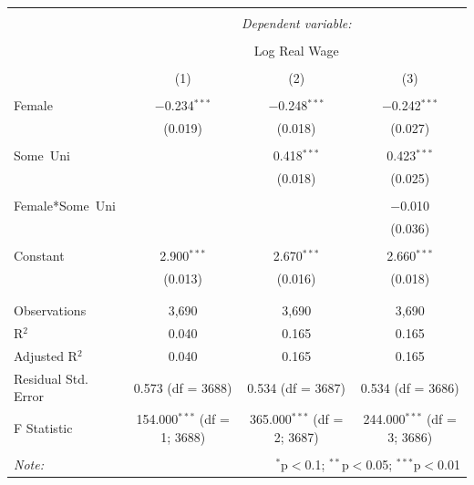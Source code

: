 \documentclass{article}
\begin{document}
\begin{table}[!htbp] \centering 
\captionsetup{labelfont=bf}
\label{tab:title}
\begin{tabular}{@{\extracolsep{5pt}}lccc} 
\\[-1.8ex]\hline 
\hline \\[-1.8ex] 
 & \multicolumn{3}{c}{\textit{Dependent variable:}} \\ 
\cline{2-4} 
\\[-1.8ex] & \multicolumn{3}{c}{Log Real Wage} \\ 
\\[-1.8ex] & (1) & (2) & (3)\\ 
\hline \\[-1.8ex] 
 Female & $-$0.234$^{***}$ & $-$0.248$^{***}$ & $-$0.242$^{***}$ \\ 
  & (0.019) & (0.018) & (0.027) \\ 
  & & & \\ 
 Some\ Uni &  & 0.418$^{***}$ & 0.423$^{***}$ \\ 
  &  & (0.018) & (0.025) \\ 
  & & & \\ 
 Female*Some\ Uni &  &  & $-$0.010 \\ 
  &  &  & (0.036) \\ 
  & & & \\ 
 Constant & 2.900$^{***}$ & 2.670$^{***}$ & 2.660$^{***}$ \\ 
  & (0.013) & (0.016) & (0.018) \\ 
  & & & \\ 
\hline \\[-1.8ex] 
Observations & 3,690 & 3,690 & 3,690 \\ 
R$^{2}$ & 0.040 & 0.165 & 0.165 \\ 
Adjusted R$^{2}$ & 0.040 & 0.165 & 0.165 \\ 
Residual Std. Error & 0.573 (df = 3688) & 0.534 (df = 3687) & 0.534 (df = 3686) \\ 
F Statistic & 154.000$^{***}$ (df = 1; 3688) & 365.000$^{***}$ (df = 2; 3687) & 244.000$^{***}$ (df = 3; 3686) \\ 
\hline 
\hline \\[-1.8ex] 
\textit{Note:}  & \multicolumn{3}{r}{$^{*}$p$<$0.1; $^{**}$p$<$0.05; $^{***}$p$<$0.01} \\ 
\end{tabular} 
\end{table}
\end{document}
